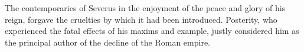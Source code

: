 

The contemporaries of Severus in the enjoyment of the peace and
glory of his reign, forgave the cruelties by which it had been
introduced. Posterity, who experienced the fatal effects of his
maxims and example, justly considered him as the principal author
of the decline of the Roman empire.

